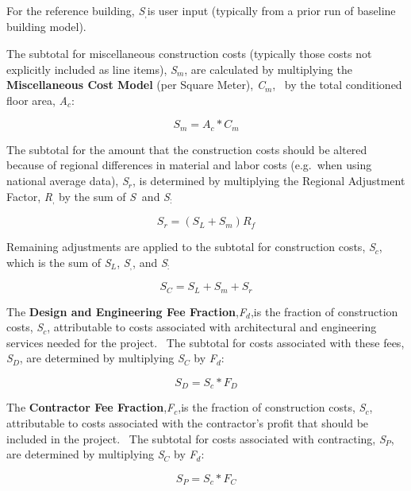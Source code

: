For the reference building, \emph{S\(_{,}\)}is user input (typically from a prior run of baseline building model).

The subtotal for miscellaneous construction costs (typically those costs not explicitly included as line items), \emph{S\(_{m}\)}, are calculated by multiplying the \textbf{Miscellaneous Cost Model} (per Square Meter), \emph{C\(_{m}\)},~ by the total conditioned floor area, \emph{A\(_{c}\)}:

\begin{equation}
{S_m} = {A_c} * {C_m}
\end{equation}

The subtotal for the amount that the construction costs should be altered because of regional differences in material and labor costs (e.g.~when using national average data), \emph{S\(_{r}\)}, is determined by multiplying the Regional Adjustment Factor, \emph{R\(_{,}\)} by the sum of \emph{S\(_{ }\)}~and \emph{S\(_{:}\)}

\begin{equation}
{S_r} = ({S_L} + {S_m}){R_f}
\end{equation}

Remaining adjustments are applied to the subtotal for construction costs, \emph{S\(_{c}\)}, which is the sum of \emph{S\(_{L}\)}, \emph{S\(_{,}\)}, and \emph{S\(_{:}\)}

\begin{equation}
{S_C} = {S_L} + {S_m} + {S_r}
\end{equation}

The \textbf{Design and Engineering Fee Fraction},\emph{F\(_{d}\)},is the fraction of construction costs, \emph{S\(_{c}\)}, attributable to costs associated with architectural and engineering services needed for the project.~ The subtotal for costs associated with these fees, \emph{S\(_{D}\)}, are determined by multiplying \emph{S\(_{C}\)} by \emph{F\(_{d}\)}:

\begin{equation}
{S_D} = {S_c}*{F_D}
\end{equation}

The \textbf{Contractor Fee Fraction},\emph{F\(_{c}\)},is the fraction of construction costs, \emph{S\(_{c}\)}, attributable to costs associated with the contractor's profit that should be included in the project.~ The subtotal for costs associated with contracting, \emph{S\(_{P}\)}, are determined by multiplying \emph{S\(_{C}\)} by \emph{F\(_{d}\)}:

\begin{equation}
{S_P} = {S_c}*{F_C}
\end{equation}

